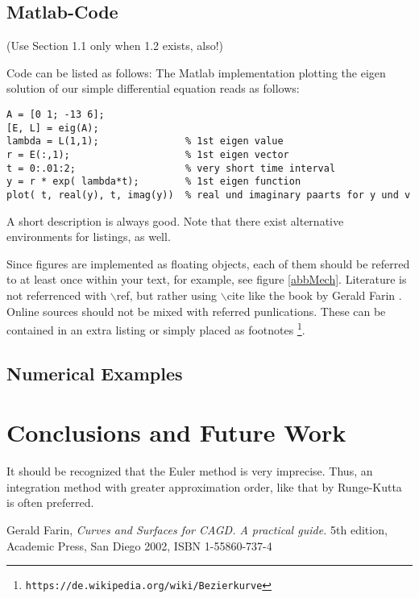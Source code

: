 \documentclass[a4paper,pdftex,12pt]{article}
\begin{document}
	
\subsection{Matlab-Code}
(Use Section 1.1 only when 1.2 exists, also!)

Code can be listed as follows:
The Matlab implementation plotting the eigen solution of our simple differential equation reads as follows:
\begin{verbatim}
A = [0 1; -13 6];
[E, L] = eig(A);
lambda = L(1,1);               % 1st eigen value
r = E(:,1);                    % 1st eigen vector
t = 0:.01:2;                   % very short time interval
y = r * exp( lambda*t);        % 1st eigen function
plot( t, real(y), t, imag(y))  % real und imaginary paarts for y und v
\end{verbatim}

A short description is always good. Note that there exist alternative environments for listings, as well.

Since figures are implemented as floating objects, each of them should be referred to at least once
within your text, for example, see figure  \ref{abbMech}.
Literature is not referrenced with $\backslash$ref, but rather using
$\backslash$cite like the book by Gerald Farin \cite{Far02}. Online sources should not be mixed with referred punlications.
These can be contained in an extra listing or simply placed as
footnotes \footnote{\tt https://de.wikipedia.org/wiki/Bezierkurve}.

\subsection{Numerical Examples}

\section{Conclusions and Future Work}
It should be recognized that the Euler method is very imprecise.
Thus, an integration method with greater approximation order, like that by Runge-Kutta is often preferred.

\begin{thebibliography}{20} %
Gerald Farin, {\it Curves and Surfaces for CAGD. A practical guide.}
5th edition, Academic Press, San Diego 2002, ISBN 1-55860-737-4
\end{thebibliography}
\end{document}
